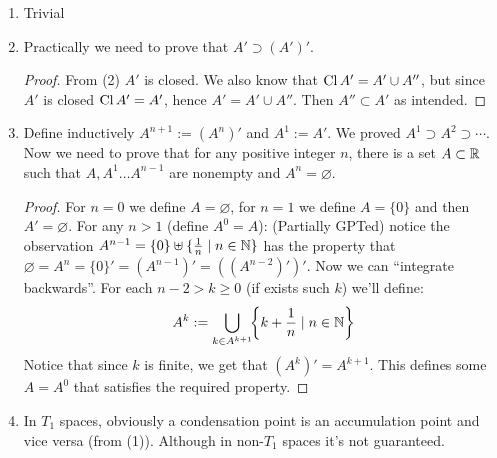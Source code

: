 \documentclass[a4paper]{article}
\begin{document}
\begin{enumerate}
\begin{proof}
\begin{itemize}
				\item[$\impliedby$]If each neighborhood of $a$ meets $A$ is an infinite set, in particular the intersection is nonempty hence $a$ in an accumulation point. 
			\end{itemize}
		\end{proof}
		\item Trivial
		\item Practically we need to prove that $A' \supset (A')'$. \begin{proof}
			From (2) $A'$ is closed. We also know that $\operatorname{Cl} A' = A' \cup A''$, but since $A'$ is closed $\operatorname{Cl} A' = A'$, hence $A' = A' \cup A''$. Then $A'' \subset A'$ as intended. 
		\end{proof}
		\item Define inductively $A^{n + 1} := (A^{n})'$ and $A^{1} := A'$. We proved $A^{1} \supset A^{2} \supset \cdots$. Now we need to prove that for any positive integer $n$, there is a set $A \subset \mathbb{R}$ such that $A, A^{1} \dots A^{n - 1}$ are nonempty and $A^{n} = \varnothing$. 
		\begin{proof}
			For $n = 0$ we define $A = \varnothing$, for $n = 1$ we define $A = \{0\}$ and then $A'= \varnothing$. For any $n > 1$ (define $A^{0} = A$): 
			(Partially GPTed) notice the observation $A^{n - 1} = \{0\} \uplus \{\frac{1}{n} \mid n \in \mathbb{N}\}$ has the property that $\varnothing = A^{n} = \{0\}' = (A^{n - 1})' = ((A^{n - 2})')'$. Now we can ``integrate backwards''. For each $n - 2> k \ge 0$ (if exists such $k$) we'll define:
			\[ A^{k} := \bigcup_{k \in A^{k + 1}}\!\!\left \{ k + \frac{1}{n} \mid n \in \mathbb{N} \right \} \]
			Notice that since $k$ is finite, we get that $(A^{k})' = A^{k + 1}$. This defines some $A = A^{0}$ that satisfies the required property. 
		\end{proof}
		\item In $T_1$ spaces, obviously a condensation point is an accumulation point and vice versa (from (1)). Although in non-$T_1$ spaces it's not guaranteed. 
	\end{enumerate}
	
\end{document}
